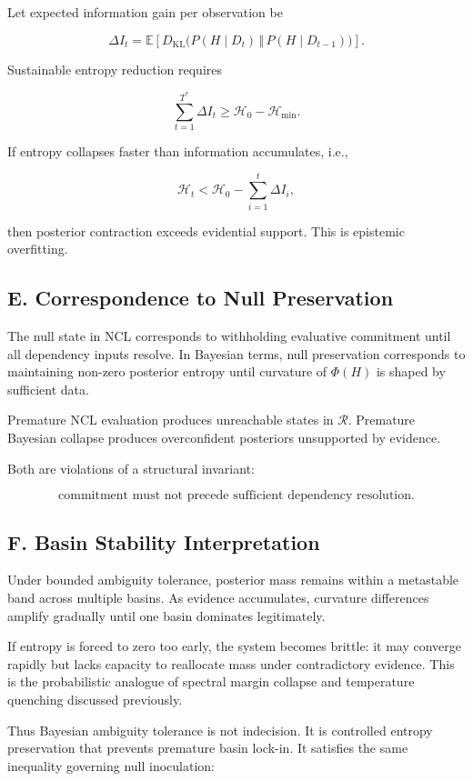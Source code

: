 \documentclass[11pt]{article}
\theoremstyle{remark}
\begin{document}
Let expected information gain per observation be

\[
\Delta I_t
=
\mathbb{E}\!\left[
D_{\mathrm{KL}}
\big(
P(H \mid D_t)
\,\Vert\,
P(H \mid D_{t-1})
\big)
\right].
\]

Sustainable entropy reduction requires

\[
\sum_{t=1}^{T^*} \Delta I_t
\ge
\mathcal{H}_0 - \mathcal{H}_{\min}.
\]

If entropy collapses faster than information accumulates, i.e.,

\[
\mathcal{H}_t
<
\mathcal{H}_0 - \sum_{i=1}^t \Delta I_i,
\]

then posterior contraction exceeds evidential support. This is epistemic overfitting.

\subsection*{E. Correspondence to Null Preservation}

The null state in NCL corresponds to withholding evaluative commitment until all dependency inputs resolve. In Bayesian terms, null preservation corresponds to maintaining non-zero posterior entropy until curvature of $\Phi(H)$ is shaped by sufficient data.

Premature NCL evaluation produces unreachable states in $\mathcal{R}$. Premature Bayesian collapse produces overconfident posteriors unsupported by evidence.

Both are violations of a structural invariant:

\[
\text{commitment must not precede sufficient dependency resolution}.
\]

\subsection*{F. Basin Stability Interpretation}

Under bounded ambiguity tolerance, posterior mass remains within a metastable band across multiple basins. As evidence accumulates, curvature differences amplify gradually until one basin dominates legitimately.

If entropy is forced to zero too early, the system becomes brittle: it may converge rapidly but lacks capacity to reallocate mass under contradictory evidence. This is the probabilistic analogue of spectral margin collapse and temperature quenching discussed previously.

Thus Bayesian ambiguity tolerance is not indecision. It is controlled entropy preservation that prevents premature basin lock-in. It satisfies the same inequality governing null inoculation:
\end{document}
